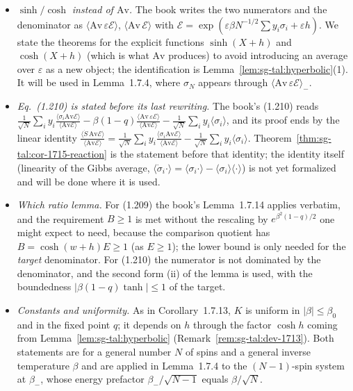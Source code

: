 \begin{remark}
\label{rem:sg-tal:dev-1715}
\begin{itemize}
\item \emph{$\sinh/\cosh$ instead of $\mathrm{Av}$.}  The book writes the two numerators and the denominator as $\langle\mathrm{Av}\,\varepsilon\mathcal E\rangle$, $\langle\mathrm{Av}\,\mathcal E\rangle$ with $\mathcal E=\exp(\varepsilon\beta N^{-1/2}\sum y_i\sigma_i+\varepsilon h)$.
  We state the theorems for the explicit functions $\sinh(X+h)$ and $\cosh(X+h)$ (which is what $\mathrm{Av}$ produces) to avoid introducing an average over $\varepsilon$ as a new object; the identification is Lemma~\ref{lem:sg-tal:hyperbolic}(1).  It will be used in Lemma~1.7.4, where $\sigma_N$ appears through $\langle\mathrm{Av}\,\varepsilon\mathcal E\rangle_-$.
\item \emph{Eq.~(1.210) is stated before its last rewriting.}  The book's (1.210) reads $\frac1{\sqrt N}\sum_iy_i\frac{\langle\sigma_i\mathrm{Av}\mathcal E\rangle}{\langle\mathrm{Av}\mathcal E\rangle}-\beta(1-q)\frac{\langle\mathrm{Av}\,\varepsilon\mathcal E\rangle}{\langle\mathrm{Av}\mathcal E\rangle}-\frac1{\sqrt N}\sum_iy_i\langle\sigma_i\rangle$,
  and its proof ends by the linear identity $\frac{\langle\dot S\,\mathrm{Av}\mathcal E\rangle}{\langle\mathrm{Av}\mathcal E\rangle}=\frac1{\sqrt N}\sum_iy_i\frac{\langle\sigma_i\mathrm{Av}\mathcal E\rangle}{\langle\mathrm{Av}\mathcal E\rangle}-\frac1{\sqrt N}\sum_iy_i\langle\sigma_i\rangle$.
  Theorem~\ref{thm:sg-tal:cor-1715-reaction} is the statement before that identity; the identity itself (linearity of the Gibbs average, $\langle\dot\sigma_i\cdot\rangle=\langle\sigma_i\cdot\rangle-\langle\sigma_i\rangle\langle\cdot\rangle$) is not yet formalized and will be done where it is used.
\item \emph{Which ratio lemma.}  For (1.209) the book's Lemma~1.7.14 applies verbatim, and the requirement $B\ge1$ is met without the rescaling by $e^{\beta^2(1-q)/2}$ one might expect to need, because the comparison quotient has $B=\cosh(w+h)E\ge1$ (as $E\ge1$);
  the lower bound is only needed for the \emph{target} denominator.  For (1.210) the numerator is not dominated by the denominator, and the second form (ii) of the lemma is used, with the boundedness $|\beta(1-q)\tanh|\le1$ of the target.
\item \emph{Constants and uniformity.}  As in Corollary~1.7.13, $K$ is uniform in $|\beta|\le\beta_0$ and in the fixed point $q$; it depends on $h$ through the factor $\cosh h$ coming from Lemma~\ref{lem:sg-tal:hyperbolic} (Remark~\ref{rem:sg-tal:dev-1713}).  Both statements are for a general number $N$ of spins and a general inverse temperature $\beta$ and are applied in Lemma~1.7.4 to the $(N-1)$-spin system at $\beta_-$, whose energy prefactor $\beta_-/\sqrt{N-1}$ equals $\beta/\sqrt N$.
\end{itemize}
\end{remark}

